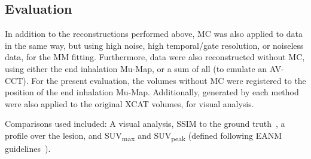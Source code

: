     
    \subsection{Evaluation} \label{sec:evaluation}
        In addition to the reconstructions performed %
        above, \gls{MC} was also applied to data in the same way, %
        but using high noise, high temporal/gate resolution, or noiseless data, for the \gls{MM} fitting. Furthermore, data were also reconstructed without \gls{MC}, using either the end inhalation \gls{Mu-Map}, or a sum of all  (to emulate an \gls{AV-CCT}). For the present evaluation, the volumes without \gls{MC} were registered to the position of the end inhalation \gls{Mu-Map}. Additionally,  generated by each method were also applied to the original \acrshort{XCAT} volumes, for visual analysis.
        
        Comparisons used included: A visual analysis, \acrshort{SSIM} to the ground truth~\cite{Wang2009MeanMeasures}, a profile over the lesion, and \acrshort{SUV}\textsubscript{max} and \acrshort{SUV}\textsubscript{peak} (defined following \acrshort{EANM} guidelines~\cite{Boellaard2015FDG2.0}).


